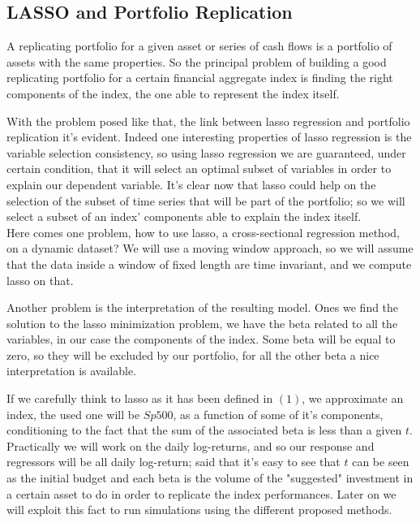 \documentclass{article}%
\begin{document}
\subsection{LASSO and Portfolio Replication}

A replicating portfolio for a given asset or series of cash flows is a portfolio of assets with the same properties. So the principal problem of building a good replicating portfolio for a certain financial aggregate index is finding the right components of the index, the one able to represent the index itself. 

With the problem posed like that, the link between lasso regression and portfolio replication it's evident. Indeed one interesting properties of lasso regression is the variable selection consistency, so using lasso regression we are guaranteed, under certain condition, that it will select an optimal subset of variables in order to explain our dependent variable. It's clear now that lasso could help on the selection of the subset of time series that will be part of the portfolio; so we will select a subset of an index' components  able to explain the index itself.
\\

Here comes one problem, how to use lasso, a cross-sectional regression method, on a dynamic dataset? We will use a moving window approach, so we will assume that the data inside a window of fixed length are time invariant, and we compute lasso on that.

Another problem is the interpretation of the resulting model. Ones we find the solution to the lasso minimization problem, we have the beta related to all the variables, in our case the components of the index. Some beta will be equal to zero, so they will be excluded by our portfolio, for all the other beta a nice interpretation is available. 

If we carefully think to lasso as it has been defined in $(1)$, we approximate an index, the used one will be $Sp500$, as a function of some of it's components, conditioning to the fact that the sum of the associated beta is less than a given $t$. Practically we will work on the daily log-returns, and so our response and regressors will be all daily log-return; said that it's easy to see that $t$ can be seen as the initial budget and each beta is the volume of the "suggested" investment in a certain asset to do in order to replicate the index performances. Later on we will exploit this fact to run simulations using the different proposed methods.
\end{document}
